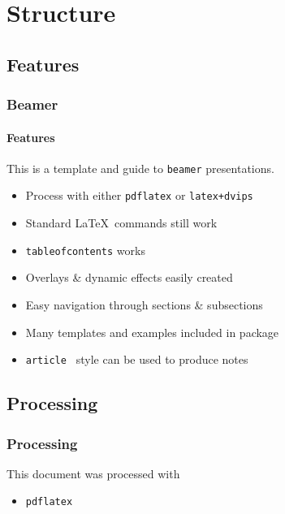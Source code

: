 \section{Structure}
\subsection{Features}
\begin{frame}
\frametitle{Beamer}
\framesubtitle{Features}
This is a template and guide to \texttt{beamer} presentations.
\begin{itemize}
\item Process with either \texttt{pdflatex} or \texttt{latex+dvips}\pause
\item Standard \LaTeX\ commands still work\pause
\item \texttt{tableofcontents} works \pause
\item Overlays \&  dynamic effects easily created\pause
\item Easy navigation through sections \&  subsections\pause
\item Many templates and examples included in package\pause
\item \texttt{article } style can be used to produce notes
\end{itemize}
\end{frame}


\subsection{Processing}
\begin{frame}[fragile] 
	\frametitle{Processing}
	
	This document was processed with 
	\begin{itemize}
		\item {\blue\texttt{pdflatex}} 
	\end{itemize}
	
	
\end{frame}


